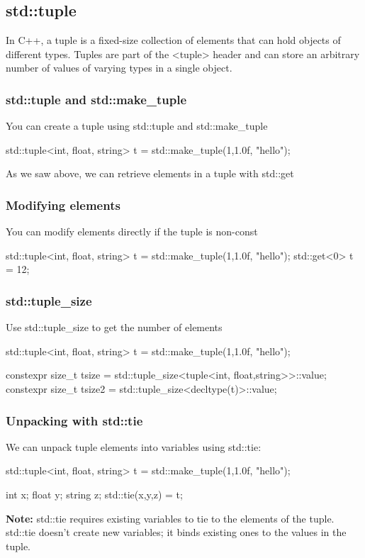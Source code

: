 \documentclass{report}
\begin{document}
     \pagebreak 
     \subsection{std::tuple}
     \bigbreak \noindent 
     In C++, a tuple is a fixed-size collection of elements that can hold objects of different types. Tuples are part of the <tuple> header and can store an arbitrary number of values of varying types in a single object.
     \bigbreak \noindent 
     \subsubsection{std::tuple and std::make\_tuple}
     \bigbreak \noindent 
     You can create a tuple using std::tuple and std::make\_tuple
     \bigbreak \noindent 
     \begin{cppcode}
         std::tuple<int, float, string> t = std::make_tuple(1,1.0f, "hello");
     \end{cppcode}
     \bigbreak \noindent 
     As we saw above, we can retrieve elements in a tuple with std::get
     \bigbreak \noindent 
     \subsubsection{Modifying elements}
     \bigbreak \noindent 
     You can modify elements directly if the tuple is non-const
     \bigbreak \noindent 
     \begin{cppcode}
         std::tuple<int, float, string> t = std::make_tuple(1,1.0f, "hello");
         std::get<0> t = 12;
     \end{cppcode}

     \bigbreak \noindent 
     \subsubsection{std::tuple\_size}
     \bigbreak \noindent 
     Use std::tuple\_size to get the number of elements
     \bigbreak \noindent 
     \begin{cppcode}
        std::tuple<int, float, string> t = std::make_tuple(1,1.0f, "hello");

        constexpr size_t tsize = std::tuple_size<tuple<int, float,string>>::value;
        constexpr size_t tsize2 = std::tuple_size<decltype(t)>::value;
     \end{cppcode}

     \pagebreak 
     \subsubsection{Unpacking with std::tie}
     \bigbreak \noindent 
     We can unpack tuple elements into variables using std::tie:
     \bigbreak \noindent 
     \begin{cppcode}
        std::tuple<int, float, string> t = std::make_tuple(1,1.0f, "hello");

        int x; float y; string z;
        std::tie(x,y,z) = t;
     \end{cppcode}
     \bigbreak \noindent 
     \textbf{Note:} std::tie requires existing variables to tie to the elements of the tuple. std::tie doesn't create new variables; it binds existing ones to the values in the tuple.
\end{document}
